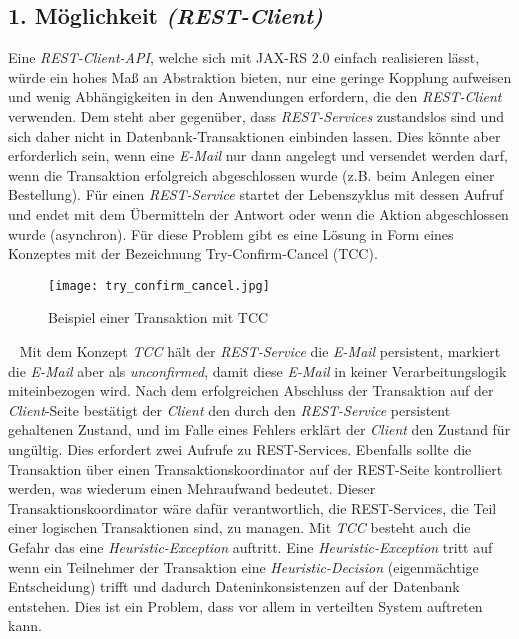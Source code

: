 \subsection{1. Möglichkeit \emph{(REST-Client)}}
Eine \emph{REST-Client-API}, welche sich mit JAX-RS 2.0 einfach realisieren lässt, würde ein hohes Maß an Abstraktion bieten, nur eine geringe Kopplung aufweisen und wenig Abhängigkeiten in den Anwendungen erfordern, die den \emph{REST-Client} verwenden. Dem steht aber gegenüber, dass \emph{REST-Services} zustandslos sind und sich daher nicht in Datenbank-Transaktionen einbinden lassen. Dies könnte aber erforderlich sein, wenn eine \emph{E-Mail} nur dann angelegt und versendet werden darf, wenn die Transaktion erfolgreich abgeschlossen wurde (z.B. beim Anlegen einer Bestellung). Für einen \emph{REST-Service} startet der Lebenszyklus mit dessen Aufruf und endet mit dem Übermitteln der Antwort oder wenn die Aktion abgeschlossen wurde (asynchron).
\newline
\newline
Für diese Problem gibt es eine Lösung in Form eines Konzeptes mit der Bezeichnung Try-Confirm-Cancel (TCC).
\begin{figure}[h]
\centering
\texttt{[image: try\_confirm\_cancel.jpg]} %
\caption{Beispiel einer Transaktion mit TCC}
\label{fig:clevermail-rest-tcc}
\end{figure}
\ \newline
Mit dem Konzept \emph{TCC} hält der \emph{REST-Service} die \emph{E-Mail} persistent, markiert die \emph{E-Mail} aber als \emph{unconfirmed}, damit diese \emph{E-Mail} in keiner Verarbeitungslogik miteinbezogen wird. Nach dem erfolgreichen Abschluss der Transaktion auf der \emph{Client}-Seite bestätigt der \emph{Client} den durch den \emph{REST-Service} persistent gehaltenen Zustand, und im Falle eines Fehlers erklärt der \emph{Client} den Zustand für ungültig. Dies erfordert zwei Aufrufe zu REST-Services. Ebenfalls sollte die Transaktion über einen Transaktionskoordinator auf der REST-Seite kontrolliert werden, was wiederum einen Mehraufwand bedeutet. Dieser Transaktionskoordinator wäre dafür verantwortlich, die REST-Services, die Teil einer logischen Transaktionen sind, zu managen. 
\newline
\newline
Mit \emph{TCC} besteht auch die Gefahr das eine \emph{Heuristic-Exception} auftritt. Eine \emph{Heuristic-Exception} tritt auf wenn ein Teilnehmer der Transaktion eine \emph{Heuristic-Decision} (eigenmächtige Entscheidung) trifft und dadurch Dateninkonsistenzen auf der Datenbank entstehen. Dies ist ein Problem, dass vor allem in verteilten System auftreten kann.
